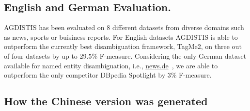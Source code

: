 




\subsection{English and German Evaluation.} AGDISTIS has been evaluated on 8 different datasets from diverse domains such as news, sports or buisiness reports.
For English datasets AGDISTIS is able to outperform the currently best disambiguation framework, TagMe2, on three out of four datasets by up to 29.5\% F-measure. 
Considering the only German dataset available for named entity disambiguation, i.e., \url{news.de}~\cite{n3}, we are able to outperform the only competitor DBpedia Spotlight by 3\% F-measure.

\subsection{How the Chinese version was generated}
\label{sec:chinese}

